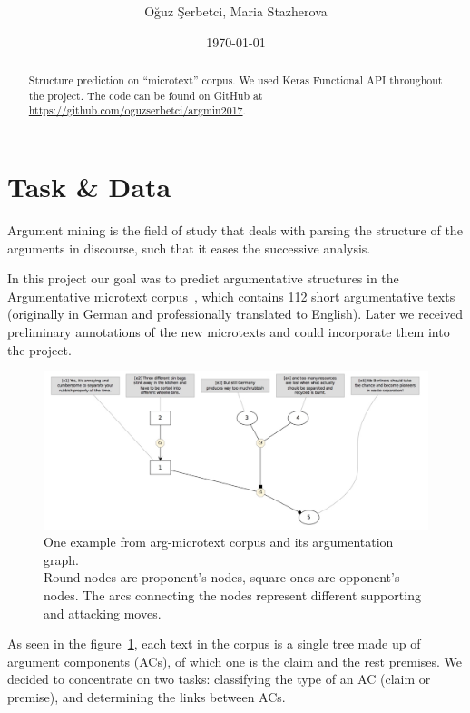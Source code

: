 \documentclass[onecolumn]{article}
\title{\spacecaps{Project module report: Argumentation Mining }\\
       \normalsize\spacesc{University of Potsdam, Winter semester 2017/18}}
\author{Oğuz Şerbetci, Maria Stazherova}
\date{\today}
\begin{document}
\maketitle

\begin{abstract}

Structure prediction on ``microtext'' corpus. We used Keras Functional API throughout the project. The code can be found on GitHub at \url{https://github.com/oguzserbetci/argmin2017}.

\end{abstract}


\section{Task \& Data}
Argument mining is the field of study that deals with parsing the structure of the arguments in discourse, such that it eases the successive analysis.

In this project our goal was to predict argumentative structures in the
Argumentative microtext corpus~\cite{peldszus2015annotated}, which contains 112 short argumentative texts
(originally in German and professionally translated to English). Later we received preliminary annotations of the new microtexts
and could incorporate them into the project.

\begin{figure}[h]
    \centering
    \includegraphics[width=0.8\linewidth]{fig/microtext.jpg}
    \caption{One example from arg-microtext corpus and its argumentation graph.
            \\Round nodes are proponent's nodes, square ones are opponent's nodes. The arcs connecting the nodes represent different supporting and attacking moves.}\label{fig:microtext}
\end{figure}

As seen in the figure~\ref{fig:microtext}, each text in the corpus is a single tree made up of argument components (ACs), of which one is the claim and the rest premises.
We decided to concentrate on two tasks: classifying the type of an AC (claim or premise), and determining the links between ACs.
\end{document}
